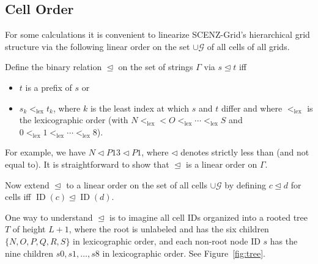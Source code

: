 \documentclass[12pt,a4paper]{amsart}
\numberwithin{figure}{section}
\newcommand{\cG}{\mathcal{G}}
\newcommand{\maxlevel}{L}
\newcommand{\llt}{<_\text{lex}}
\newcommand{\cle}{\trianglelefteq}
\newcommand{\clt}{\triangleleft}
\DeclareMathOperator{\id}{ID}
\begin{document}
% 
%  
% 

\subsection{Cell Order}

For some calculations it is convenient to linearize SCENZ-Grid's hierarchical grid structure via the following linear order on the set $\cup\cG$ of all cells of all grids.

Define the binary relation $\cle$ on the set of strings $\Gamma$ via $s \cle t$ iff
\begin{itemize}
\item $t$ is a prefix of $s$ or
\item $s_k \llt t_k$, where $k$ is the least index at which $s$ and $t$ differ and where $\llt$ is the lexicographic order (with $N \llt < O \llt \cdots \llt S$ and $0 \llt 1 \llt \cdots \llt 8$).
\end{itemize}
For example, we have $N \clt P13 \clt P1$, where $\clt$ denotes strictly less than (and not equal to).
It is straightforward to show that $\cle$ is a linear order on $\Gamma$.

Now extend $\cle$ to a linear order on the set of all cells $\cup\cG$ by defining $c \cle d$ for cells iff $\id(c) \cle \id(d)$.

One way to understand $\cle$ is to imagine all cell IDs organized into a rooted tree $T$ of height $\maxlevel + 1$, where the root is unlabeled and has the six children $\{N, O, P, Q, R, S\}$ in lexicographic order, and each non-root node ID $s$ has the nine children $s0, s1, \ldots, s8$ in lexicographic order.
See Figure~\ref{fig:tree}.
\end{document}
